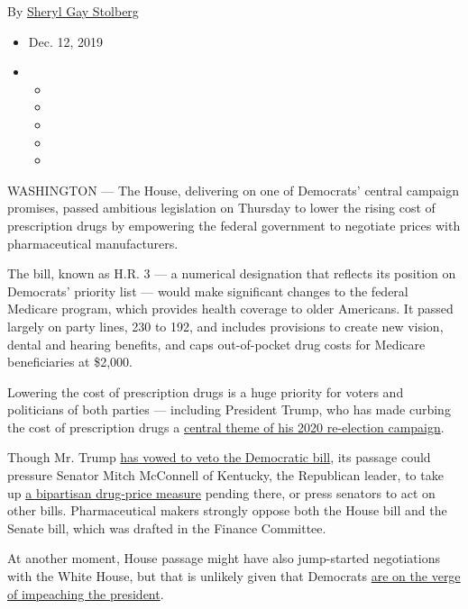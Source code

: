 By
\href{https://www.nytimes3xbfgragh.onion/by/sheryl-gay-stolberg}{Sheryl
Gay Stolberg}

\begin{itemize}
\item
  Dec. 12, 2019
\item
  \begin{itemize}
  \item
  \item
  \item
  \item
  \item
  \end{itemize}
\end{itemize}

WASHINGTON --- The House, delivering on one of Democrats' central
campaign promises, passed ambitious legislation on Thursday to lower the
rising cost of prescription drugs by empowering the federal government
to negotiate prices with pharmaceutical manufacturers.

The bill, known as H.R. 3 --- a numerical designation that reflects its
position on Democrats' priority list --- would make significant changes
to the federal Medicare program, which provides health coverage to older
Americans. It passed largely on party lines, 230 to 192, and includes
provisions to create new vision, dental and hearing benefits, and caps
out-of-pocket drug costs for Medicare beneficiaries at \$2,000.

Lowering the cost of prescription drugs is a huge priority for voters
and politicians of both parties --- including President Trump, who has
made curbing the cost of prescription drugs a
\href{https://www.nytimes3xbfgragh.onion/2019/07/11/health/drug-prices-rebate-donald-trump.html}{central
theme of his 2020 re-election campaign}.

Though Mr. Trump
\href{https://www.whitehouse.gov/wp-content/uploads/2019/12/SAP_HR-3.pdf}{has
vowed to veto the Democratic bill}, its passage could pressure Senator
Mitch McConnell of Kentucky, the Republican leader, to take up
\href{https://www.grassley.senate.gov/news/news-releases/grassley-wyden-release-updated-prescription-drug-pricing-reduction-act-reach}{a
bipartisan drug-price measure} pending there, or press senators to act
on other bills. Pharmaceutical makers strongly oppose both the House
bill and the Senate bill, which was drafted in the Finance Committee.

At another moment, House passage might have also jump-started
negotiations with the White House, but that is unlikely given that
Democrats
\href{https://www.nytimes3xbfgragh.onion/2019/12/12/us/politics/trump-impeachment-judiciary.html}{are
on the verge of impeaching the president}.

